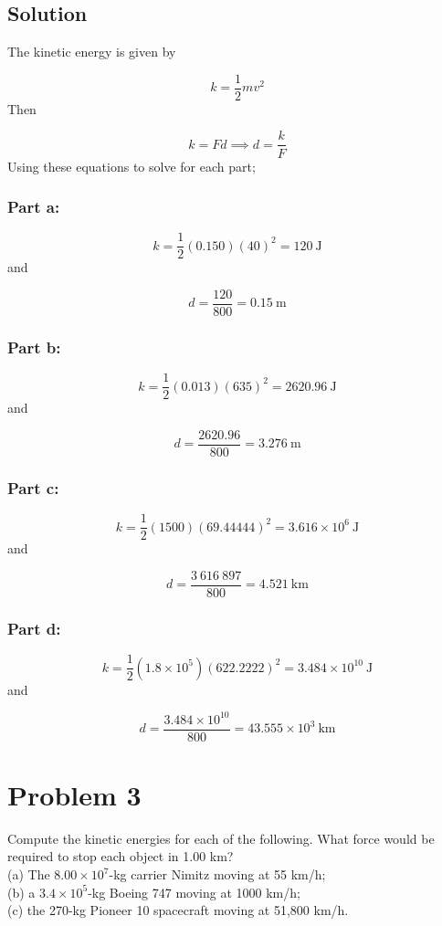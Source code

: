 \documentclass{article}
\begin{document}
\subsection*{Solution}
The kinetic energy is given by

\begin{equation}
	k = \frac{1}{2}mv^2
\end{equation}
Then

\[
	k = Fd \implies d = \frac{k}{F}
\]
Using these equations to solve for each part;
\subsubsection*{Part a:}
\[
	k = \frac{1}{2} (0.150)(40)^2 = \boxed{120\ \text{J}}
\]
and

\[
	d = \frac{120}{800} = \boxed{0.15\ \text{m}}
\]

\subsubsection*{Part b:}
\[
	k = \frac{1}{2} (0.013)(635)^2 = \boxed{2620.96\ \text{J}}
\]
and

\[
	d = \frac{2620.96}{800} = \boxed{3.276\ \text{m}}
\]

\subsubsection*{Part c:}
\[
	k = \frac{1}{2} (1500)(69.44444)^2 = \boxed{3.616 \times 10^6\ \text{J}}
\]
and

\[
	d = \frac{3\ 616\ 897}{800} = \boxed{4.521\ \text{km}}
\]

\subsubsection*{Part d:}
\[
	k = \frac{1}{2} (1.8 \times 10^5)(622.2222)^2 = \boxed{3.484\times10^{10}\ \text{J}}
\]
and

\[
	d = \frac{3.484\times10^{10}}{800} = \boxed{43.555 \times 10^3\ \text{km}}
\]


\section*{Problem 3}
Compute the kinetic energies for each of the following. What force would be required to stop each object in
1.00 km? \\
(a) The $8.00 \times 10^7$-kg carrier Nimitz moving at 55 km/h; \\
(b) a $3.4 \times 10^5$-kg Boeing 747 moving at 1000 km/h; \\
(c) the 270-kg Pioneer 10 spacecraft moving at 51,800 km/h.
\end{document}
